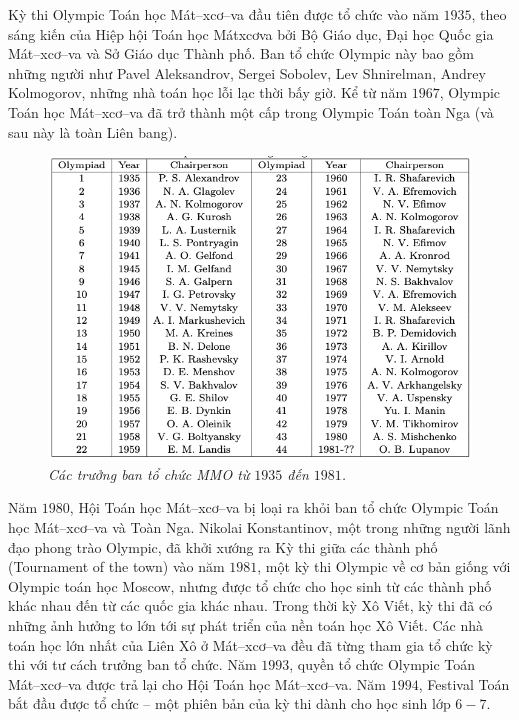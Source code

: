 \begin{multicols}{2}
	Kỳ thi Olympic Toán học Mát--xcơ--va đầu tiên được tổ chức vào năm $1935$, theo sáng kiến của Hiệp hội Toán học Mátxcơva bởi Bộ Giáo dục, Đại học Quốc gia Mát--xcơ--va và Sở Giáo dục Thành phố. Ban tổ chức Olympic này bao gồm những người như Pavel Aleksandrov, Sergei Sobolev, Lev Shnirelman, Andrey Kolmogorov, những nhà toán học lỗi lạc thời bấy giờ. Kể từ năm $1967$, Olympic Toán học Mát--xcơ--va đã trở thành một cấp trong Olympic Toán toàn Nga (và sau này là toàn Liên bang).
	\begin{figure}[H]
		\vspace*{-5pt}
		\centering
		\captionsetup{labelformat= empty, justification=centering}
		\includegraphics[width= 1\linewidth]{1}
		\caption{\small\textit{\color{cackithi}Các trưởng ban tổ chức MMO từ $1935$ đến $1981$.}}
		\vspace*{-10pt}
	\end{figure}
	Năm $1980$, Hội Toán học Mát--xcơ--va bị loại ra khỏi ban tổ chức Olympic Toán học Mát--xcơ--va và Toàn Nga. Nikolai Konstantinov, một trong những người lãnh đạo phong trào Olympic, đã khởi xướng ra Kỳ thi giữa các thành phố (Tournament of the town) vào năm $1981$, một kỳ thi Olympic về cơ bản giống với Olympic toán học Moscow, nhưng được tổ chức cho học sinh từ các thành phố khác nhau đến từ các quốc gia khác nhau.  
	\vskip 0.1cm
	Trong thời kỳ Xô Viết, kỳ thi đã có những ảnh hưởng to lớn tới sự phát triển của nền toán học Xô Viết. Các nhà toán học lớn nhất của Liên Xô ở Mát--xcơ--va đều đã từng tham gia tổ chức kỳ thi với tư cách trưởng ban tổ chức. 
	\vskip 0.1cm
	Năm $1993$, quyền tổ chức Olympic Toán Mát--xcơ--va được trả lại cho Hội Toán học Mát--xcơ--va. Năm $1994$, Festival Toán bắt đầu được tổ chức -- một phiên bản của kỳ thi dành cho học sinh lớp $6-7$.

\end{multicols}
